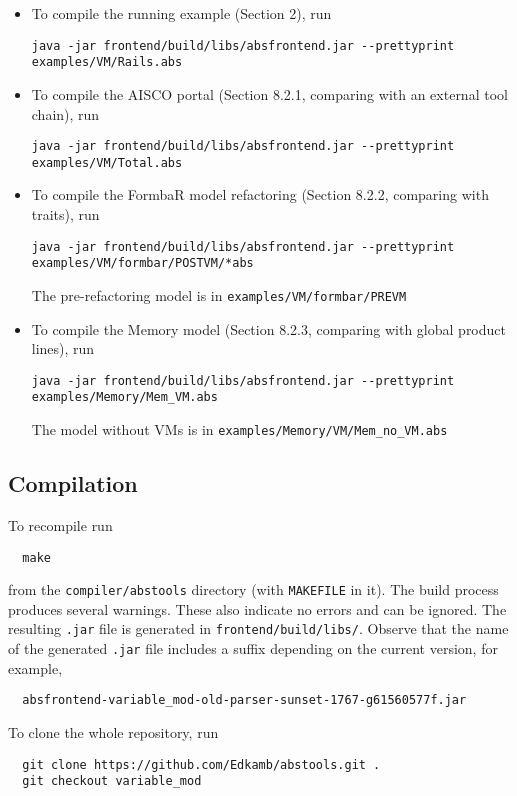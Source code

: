 \documentclass[runningheads]{llncs}
\begin{document}
\begin{itemize}
\item To compile the running example (Section 2), run

{\tt\small  java -jar frontend/build/libs/absfrontend.jar -{}-prettyprint examples/VM/Rails.abs}


\item To compile the AISCO portal (Section 8.2.1, comparing with an external tool chain), run

{\tt\small  java -jar frontend/build/libs/absfrontend.jar -{}-prettyprint examples/VM/Total.abs}




\item To compile the FormbaR model refactoring (Section 8.2.2, comparing with traits), run

{\tt\small  java -jar frontend/build/libs/absfrontend.jar -{}-prettyprint examples/VM/formbar/POSTVM/*abs}

The pre-refactoring model is in \texttt{examples/VM/formbar/PREVM}


\item To compile the Memory model (Section 8.2.3, comparing with global product lines), run

{\tt\small  java -jar frontend/build/libs/absfrontend.jar -{}-prettyprint examples/Memory/Mem\_VM.abs}


The model without VMs is in \texttt{examples/Memory/VM/Mem\_no\_VM.abs}
\end{itemize}

\subsection{Compilation}\label{sec:compile}
To recompile run 
\begin{verbatim}
  make
\end{verbatim}
from the \texttt{compiler/abstools} directory (with \texttt{MAKEFILE} in it).
The build process produces several warnings. These also indicate no errors and can be ignored.
The resulting \texttt{.jar} file is generated in \texttt{frontend/build/libs/}. 
Observe that the name of the generated \texttt{.jar} file includes a suffix depending on the current version, for example, 
\begin{verbatim}
  absfrontend-variable_mod-old-parser-sunset-1767-g61560577f.jar
\end{verbatim}
To clone the whole repository, run 
\begin{verbatim}
  git clone https://github.com/Edkamb/abstools.git .
  git checkout variable_mod
\end{verbatim}
\end{document}
